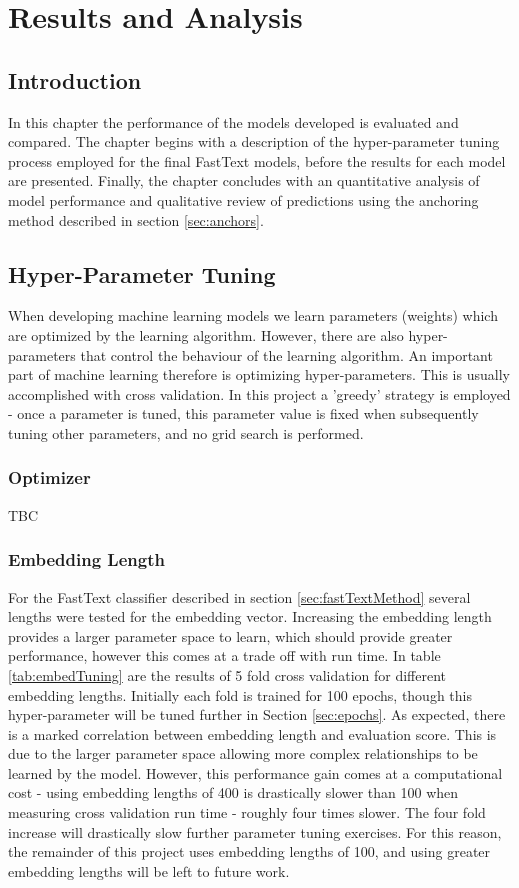 \documentclass[Dissertation.tex]{subfiles}
\begin{document}
\chapter{Results and Analysis}
\section{Introduction}
In this chapter the performance of the models developed is evaluated and compared. The chapter begins with a description of the hyper-parameter tuning process employed for the final FastText models, before the results for each model are presented. Finally, the chapter concludes with an quantitative analysis of model performance and qualitative review of predictions using the anchoring method described in section \ref{sec:anchors}.

\section{Hyper-Parameter Tuning} \label{sec:hypParams}
When developing machine learning models we learn parameters (weights) which are optimized by the learning algorithm. However, there are also hyper-parameters that control the behaviour of the learning algorithm. An important part of machine learning therefore is optimizing hyper-parameters. This is usually accomplished with cross validation. In this project a 'greedy' strategy is employed - once a parameter is tuned, this parameter value is fixed when subsequently tuning other parameters, and no grid search is performed.

\subsection{Optimizer}
TBC

\subsection{Embedding Length}
For the FastText classifier described in section \ref{sec:fastTextMethod} several lengths were tested for the embedding vector. Increasing the embedding length provides a larger parameter space to learn, which should provide greater performance, however this comes at a trade off with run time. In table \ref{tab:embedTuning} are the results of 5 fold cross validation for different embedding lengths. Initially each fold is trained for 100 epochs, though this hyper-parameter will be tuned further in Section \ref{sec:epochs}. As expected, there is a marked correlation between embedding length and evaluation score. This is due to the larger parameter space allowing more complex relationships to be learned by the model. However, this performance gain comes at a computational cost - using embedding lengths of 400 is drastically slower than 100 when measuring cross validation run time - roughly four times slower. The four fold increase will drastically slow further parameter tuning exercises. For this reason, the remainder of this project uses embedding lengths of 100, and using greater embedding lengths will be left to future work.
\end{document}

